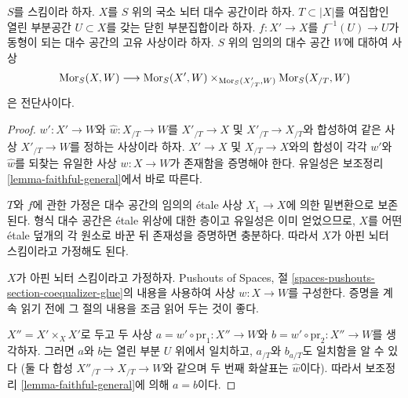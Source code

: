 \begin{proposition}
\label{proposition-glue-modification}
$S$를 스킴이라 하자. $X$를 $S$ 위의 국소 뇌터 대수 공간이라 하자.
$T \subset |X|$를 여집합인 열린 부분공간 $U \subset X$를 갖는
닫힌 부분집합이라 하자. $f : X' \to X$를
$f^{-1}(U) \to U$가 동형이 되는 대수 공간의 고유 사상이라 하자.
$S$ 위의 임의의 대수 공간 $W$에 대하여 사상
$$
\mathop{\mathrm{Mor}}\nolimits_S(X, W) \longrightarrow
\mathop{\mathrm{Mor}}\nolimits_S(X', W) \times_{\mathop{\mathrm{Mor}}\nolimits_S(X'_{/T}, W)} \mathop{\mathrm{Mor}}\nolimits_S(X_{/T}, W)
$$
은 전단사이다.
\end{proposition}

\begin{proof}
$w' : X' \to W$와 $\hat w : X_{/T} \to W$를
$X'_{/T} \to X$ 및 $X'_{/T} \to X_{/T}$와 합성하여
같은 사상 $X'_{/T} \to W$를 정하는 사상이라 하자.
$X' \to X$ 및 $X_{/T} \to X$와의 합성이 각각 $w'$와 $\hat w$를
되찾는 유일한 사상 $w : X \to W$가 존재함을 증명해야 한다.
유일성은 보조정리 \ref{lemma-faithful-general}에서 바로 따른다.

\medskip\noindent
$T$와 $f$에 관한 가정은 대수 공간의 임의의 \'etale 사상
$X_1 \to X$에 의한 밑변환으로 보존된다.
형식 대수 공간은 \'etale 위상에 대한 층이고 유일성은 이미 얻었으므로,
$X$를 어떤 \'etale 덮개의 각 원소로 바꾼 뒤 존재성을 증명하면 충분하다.
따라서 $X$가 아핀 뇌터 스킴이라고 가정해도 된다.

\medskip\noindent
$X$가 아핀 뇌터 스킴이라고 가정하자. Pushouts of Spaces, 절
\ref{spaces-pushouts-section-coequalizer-glue}의 내용을 사용하여
사상 $w : X \to W$를 구성한다.
증명을 계속 읽기 전에 그 절의 내용을 조금 읽어 두는 것이 좋다.

\medskip\noindent
$X'' = X' \times_X X'$로 두고 두 사상
$a = w' \circ \text{pr}_1 : X'' \to W$와
$b = w' \circ \text{pr}_2 : X'' \to W$를 생각하자.
그러면 $a$와 $b$는 열린 부분 $U$ 위에서 일치하고,
$a_{/T}$와 $b_{a/T}$도 일치함을 알 수 있다
(둘 다 합성 $X''_{/T} \to X_{/T} \to W$와 같으며
두 번째 화살표는 $\hat w$이다).
따라서 보조정리 \ref{lemma-faithful-general}에 의해 $a = b$이다.


\end{proof}
